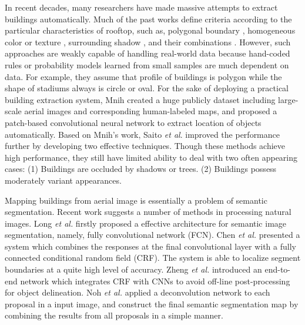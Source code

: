 \documentclass[runningheads]{llncs}
\begin{document}
   In recent decades, many researchers have made massive attempts to extract buildings automatically. Much of the past works define criteria according to the particular  characteristics of rooftop, such as, polygonal boundary \cite{noronha2001detection,nosrati2009novel,izadi2012three,wang2015efficient}, homogeneous color or texture \cite{cote2013automatic}, surrounding shadow \cite{B2008Building,ok2013automated,chen2014shadow,ngoautomatic}, and their combinations \cite{baluyan2013novel,li2015robust}. However, such approaches are weakly capable of handling real-world data because hand-coded rules or probability models learned from small samples are much dependent on data. For example, they assume that profile of buildings is polygon while the shape of stadiums always is circle or oval. For the sake of deploying a practical building extraction system, Mnih \cite{Mnih2013Machine} created a huge publicly dataset including large-scale aerial images and corresponding human-labeled maps, and proposed a patch-based convolutional neural network to extract location of objects automatically. Based on Mnih's work, Saito \textit{et al}. \cite{Saito2016Multiple} improved the performance further by developing two effective techniques. Though these methods achieve high performance, they still have limited ability to deal with two often appearing cases: (1) Buildings are  occluded by shadows or trees. (2) Buildings possess moderately variant appearances. 
      
   Mapping buildings from aerial image is essentially a problem of semantic segmentation. Recent work suggests a number of methods in processing natural images. Long \textit{et al.} \cite{Long2014Fully} firstly proposed a effective architecture for semantic image segmentation, namely, fully convolutional network (FCN).  
Chen \textit{et al.} \cite{chen14semantic} presented a system which combines the responses at the final convolutional layer with a fully connected conditional random field (CRF). The system is able to localize segment boundaries at a quite high level of accuracy. Zheng \textit{et al.} \cite{Zheng2015Conditional} introduced an end-to-end network  which integrates CRF with CNNs to avoid off-line post-processing  for object delineation. Noh \textit{et al.} \cite{Noh2015Learning} applied a deconvolution network to each proposal in a input image, and construct the final semantic segmentation map by combining the results from all proposals in a simple manner.
     
\end{document}
